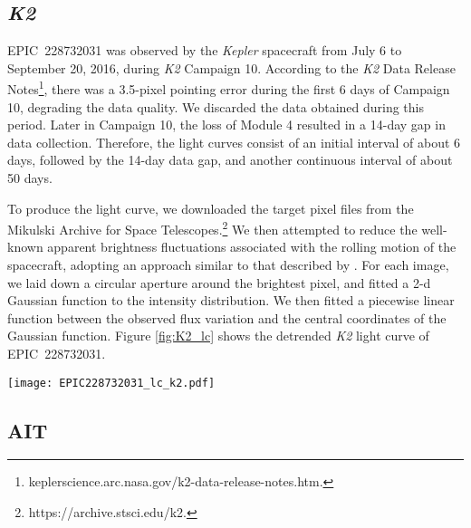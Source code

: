 \documentclass[twocolumn]{aastex61}
\begin{document}
\subsection{{\it K2}}

EPIC~228732031 was observed by the {\it Kepler} spacecraft from July 6 to September 20, 2016, during {\it K2} Campaign 10. According to the {\it K2} Data Release Notes\footnote{keplerscience.arc.nasa.gov/k2-data-release-notes.htm.}, there was a 3.5-pixel pointing error during the first 6 days of Campaign 10, degrading the data quality. We discarded the data obtained during this period. Later in Campaign 10, the loss of Module 4 resulted in a 14-day gap in data collection. Therefore, the light curves consist of an initial interval of about 6 days, followed by the 14-day data gap, and another continuous interval of about 50 days.

To produce the light curve, we downloaded the target pixel files from the Mikulski Archive for Space Telescopes.\footnote{https://archive.stsci.edu/k2.} We then attempted to reduce
the well-known apparent brightness fluctuations associated with the rolling motion of the spacecraft,
adopting an approach similar to that described by  \citet{VJ2014}. For each image, we laid down a circular aperture around the brightest pixel, and fitted a 2-d Gaussian function to the intensity distribution. We then fitted a piecewise linear function between the observed flux variation and the central coordinates of the Gaussian function. Figure \ref{fig:K2_lc} shows the detrended {\it K2} light curve of EPIC~228732031.

\begin{figure*}
\begin{center}
\texttt{[image: EPIC228732031\_lc\_k2.pdf]}
\caption{{\it K2} light curve of EPIC~228732031, after removing the transits of planet b. The black circles are binned fluxes. The light curve shows a rotational modulation with a period of 9.4 days and an amplitude of about 0.5\%. The green curve shows the Gaussian Process regression of the {\it K2} light curve with a quasi-periodic kernel (Section \ref{sec:gp}). The blue shaded region is the 1$\sigma$ confidence interval of the Gaussian Process.}
\label{fig:K2_lc}
\end{center}
\end{figure*}

\subsection{AIT}
\end{document}
